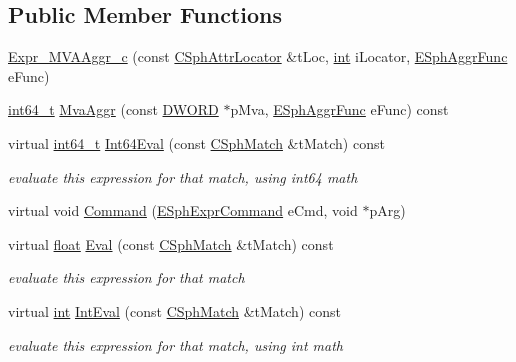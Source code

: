 \subsection*{Public Member Functions}
\begin{DoxyCompactItemize}
\item 
\hyperlink{classExpr__MVAAggr__c_abba0cafb5e74e31d6e48b5e9b4121eb4}{Expr\-\_\-\-M\-V\-A\-Aggr\-\_\-c} (const \hyperlink{structCSphAttrLocator}{C\-Sph\-Attr\-Locator} \&t\-Loc, \hyperlink{sphinxexpr_8cpp_a4a26e8f9cb8b736e0c4cbf4d16de985e}{int} i\-Locator, \hyperlink{sphinx_8h_a92532037c3ec9dad4a636e957fff58c9}{E\-Sph\-Aggr\-Func} e\-Func)
\item 
\hyperlink{sphinxstd_8h_a996e72f71b11a5bb8b3b7b6936b1516d}{int64\-\_\-t} \hyperlink{classExpr__MVAAggr__c_a21b7a05d7eff0baf56db2d3c337d779f}{Mva\-Aggr} (const \hyperlink{sphinxstd_8h_a798af1e30bc65f319c1a246cecf59e39}{D\-W\-O\-R\-D} $\ast$p\-Mva, \hyperlink{sphinx_8h_a92532037c3ec9dad4a636e957fff58c9}{E\-Sph\-Aggr\-Func} e\-Func) const 
\item 
virtual \hyperlink{sphinxstd_8h_a996e72f71b11a5bb8b3b7b6936b1516d}{int64\-\_\-t} \hyperlink{classExpr__MVAAggr__c_a7aede15d7a4b541ea88ca1421bd9cfbf}{Int64\-Eval} (const \hyperlink{classCSphMatch}{C\-Sph\-Match} \&t\-Match) const 
\begin{DoxyCompactList}\small\item\em evaluate this expression for that match, using int64 math \end{DoxyCompactList}\item 
virtual void \hyperlink{classExpr__MVAAggr__c_aa96dcf807cf92456a6781bf01709cb21}{Command} (\hyperlink{sphinxexpr_8h_a30be184fb07bd80c271360fc6094c818}{E\-Sph\-Expr\-Command} e\-Cmd, void $\ast$p\-Arg)
\item 
virtual \hyperlink{sphinxexpr_8cpp_a0e0d0739f7035f18f949c2db2c6759ec}{float} \hyperlink{classExpr__MVAAggr__c_a6b6394ba158aed25b5a021129537db67}{Eval} (const \hyperlink{classCSphMatch}{C\-Sph\-Match} \&t\-Match) const 
\begin{DoxyCompactList}\small\item\em evaluate this expression for that match \end{DoxyCompactList}\item 
virtual \hyperlink{sphinxexpr_8cpp_a4a26e8f9cb8b736e0c4cbf4d16de985e}{int} \hyperlink{classExpr__MVAAggr__c_a2d7fcfc7e019615e6c98efede738dc2b}{Int\-Eval} (const \hyperlink{classCSphMatch}{C\-Sph\-Match} \&t\-Match) const 
\begin{DoxyCompactList}\small\item\em evaluate this expression for that match, using int math \end{DoxyCompactList}\item 

\end{DoxyCompactItemize}
